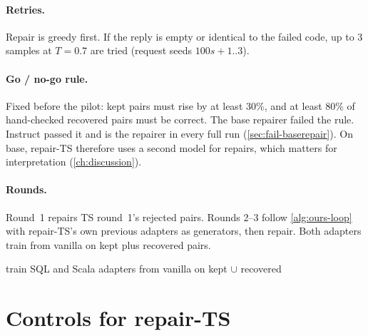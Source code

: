 \paragraph{Retries.} Repair is greedy first. If the reply is empty or identical to the failed code, up to 3 samples at
$T=0.7$ are tried (request seeds $100s+1..3$).

\paragraph{Go / no-go rule.} Fixed before the pilot: kept pairs must rise by at least 30\%, and at least 80\% of
hand-checked recovered pairs must be correct. The base repairer failed the rule. Instruct passed it and is the
repairer in every full run (\cref{sec:fail-baserepair}). On base, repair-TS therefore uses a second model for repairs,
which matters for interpretation (\cref{ch:discussion}).

\paragraph{Rounds.} Round~1 repairs TS round~1's rejected pairs. Rounds 2--3 follow \cref{alg:ours-loop} with repair-TS's
own previous adapters as generators, then repair. Both adapters train from vanilla on kept plus recovered pairs.

\begin{algorithm}[htbp]
\caption{Repair-TS for one round (, )}\label{alg:repair}
train SQL and Scala adapters from vanilla on kept $\cup$ recovered\;
\end{algorithm}

\section{Controls for repair-TS}\label{sec:method-controls}

